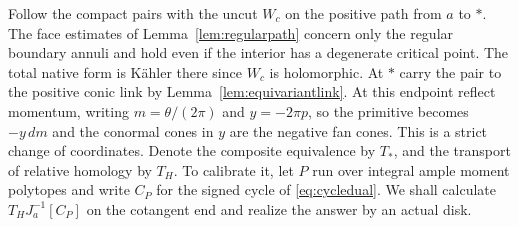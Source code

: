 Follow the compact pairs with the uncut $W_c$ on the positive path from $a$ to $*$. The face estimates of Lemma~\ref{lem:regularpath} concern only the regular boundary annuli and hold even if the interior has a degenerate critical point. The total native form is Kähler there since $W_c$ is holomorphic. At $*$ carry the pair to the positive conic link by Lemma~\ref{lem:equivariantlink}. At this endpoint reflect momentum, writing $m=\theta/(2\pi)$ and $y=-2\pi p$, so the primitive becomes $-y\,dm$ and the conormal cones in $y$ are the negative fan cones. This is a strict change of coordinates. Denote the composite equivalence by $T_*$, and the transport of relative homology by $T_H$. To calibrate it, let $P$ run over integral ample moment polytopes and write $C_P$ for the signed cycle of \eqref{eq:cycledual}. We shall calculate $T_H J_a^{-1}[C_P]$ on the cotangent end and realize the answer by an actual disk.
